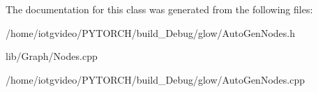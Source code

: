 The documentation for this class was generated from the following files\+:\begin{DoxyCompactItemize}
\item 
/home/iotgvideo/\+P\+Y\+T\+O\+R\+C\+H/build\+\_\+\+Debug/glow/Auto\+Gen\+Nodes.\+h\item 
lib/\+Graph/Nodes.\+cpp\item 
/home/iotgvideo/\+P\+Y\+T\+O\+R\+C\+H/build\+\_\+\+Debug/glow/Auto\+Gen\+Nodes.\+cpp\end{DoxyCompactItemize}
